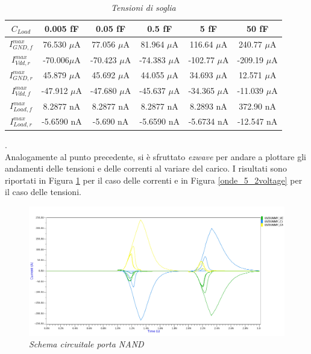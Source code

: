 \begin{table}[!h]\footnotesize
	\centering
	\begin{tabular}{|c|c|c|c|c|c|}
		\hline
		\textbf{$C_{Load}$} & \textbf{0.005 fF} & \textbf{0.05 fF} & \textbf{0.5 fF} & \textbf{5 fF} & \textbf{50 fF}\\
		\hline
		$I_{GND, f}^{max}$ &76.530 $\mu$A &77.056 $\mu$A &81.964 $\mu$A &116.64 $\mu$A &240.77 $\mu$A \\
		
		$I_{Vdd, r}^{max}$ &-70.006$\mu$A &-70.423 $\mu$A &-74.383 $\mu$A &-102.77 $\mu$A &-209.19 $\mu$A \\
		
		$I_{GND, r}^{max}$&45.879 $\mu$A &45.692 $\mu$A &44.055 $\mu$A &34.693 $\mu$A &12.571 $\mu$A\\
		
		$I_{Vdd, f}^{max}$& -47.912 $\mu$A&-47.680 $\mu$A &-45.637 $\mu$A &-34.365 $\mu$A &-11.039 $\mu$A \\
		
		$I_{Load, f}^{max}$ &8.2877 nA &8.2877 nA &8.2877 nA &8.2893 nA &372.90 nA \\
		
		$I_{Load, r}^{max}$ &-5.6590 nA &-5.690 nA &-5.6590 nA &-5.6734 nA &-12.547 nA \\
		\hline
	\end{tabular}
	\caption{\textit{Tensioni di soglia}}
	\label{Tab5_5}
\end{table}.
\\
Analogamente al punto precedente, si è sfruttato \textit{ezwave} per andare a plottare gli andamenti delle tensioni e delle correnti al variare del carico. I risultati sono riportati in Figura \ref{onde_5_2current} per il caso delle correnti e in Figura \ref{onde_5_2voltage} per il caso delle tensioni.\\
\begin{figure}[!htb]
	\centering
	\includegraphics[scale=0.09]{immagini/onde_5_2current}
	\caption{\textit{Schema circuitale porta NAND}}
	\label{onde_5_2current}
\end{figure}
